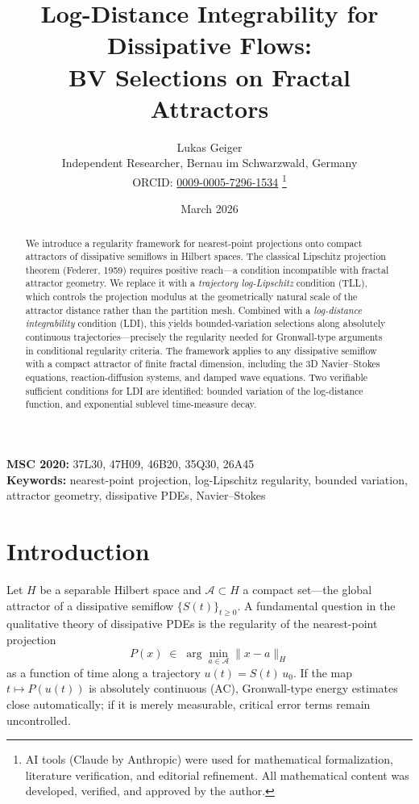 \documentclass[12pt,a4paper]{article}
\title{\textbf{Log-Distance Integrability for Dissipative Flows:\\
BV Selections on Fractal Attractors}}
\author{Lukas Geiger\\
\small Independent Researcher, Bernau im Schwarzwald, Germany\\
\small ORCID: \href{https://orcid.org/0009-0005-7296-1534}{0009-0005-7296-1534}%
\thanks{AI tools (Claude by Anthropic) were used for mathematical formalization, literature verification, and editorial refinement. All mathematical content was developed, verified, and approved by the author.}}
\date{March 2026}
\theoremstyle{definition}
\theoremstyle{plain}
\theoremstyle{remark}
\begin{document}
\maketitle

\begin{center}
\small
\textbf{MSC 2020:} 37L30, 47H09, 46B20, 35Q30, 26A45\\
\textbf{Keywords:} nearest-point projection, log-Lipschitz regularity,
bounded variation, attractor geometry, dissipative PDEs, Navier--Stokes
\end{center}

\begin{abstract}
We introduce a regularity framework for nearest-point projections
onto compact attractors of dissipative semiflows in Hilbert spaces.
The classical Lipschitz projection theorem (Federer, 1959) requires
positive reach---a condition incompatible with fractal attractor
geometry.  We replace it with a \emph{trajectory log-Lipschitz}
condition (TLL), which controls the projection modulus at the
geometrically natural scale of the attractor distance rather than
the partition mesh.  Combined with a \emph{log-distance
integrability} condition (LDI), this yields bounded-variation
selections along absolutely continuous trajectories---precisely the
regularity needed for Gronwall-type arguments in conditional
regularity criteria.  The framework applies to any dissipative
semiflow with a compact attractor of finite fractal dimension,
including the 3D Navier--Stokes equations, reaction-diffusion
systems, and damped wave equations.  Two verifiable sufficient
conditions for LDI are identified: bounded variation of the
log-distance function, and exponential sublevel time-measure decay.
\end{abstract}


\section{Introduction}

Let $H$ be a separable Hilbert space and $\mathcal{A} \subset H$ a
compact set---the global attractor of a dissipative semiflow
$\{S(t)\}_{t \ge 0}$.  A fundamental question in the qualitative
theory of dissipative PDEs is the regularity of the nearest-point
projection
\[
  P(x) \;\in\; \arg\min_{a \in \mathcal{A}} \|x - a\|_H
\]
as a function of time along a trajectory $u(t) = S(t)\,u_0$.  If the
map $t \mapsto P(u(t))$ is absolutely continuous (AC), Gronwall-type
energy estimates close automatically; if it is merely measurable,
critical error terms remain uncontrolled.
\end{document}
